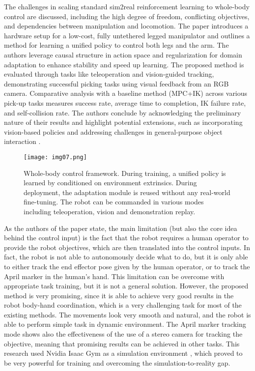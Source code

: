 The challenges in scaling standard sim2real reinforcement learning to whole-body control
are discussed, including the high degree of freedom, conflicting objectives, and dependencies
between manipulation and locomotion. The paper introduces a hardware setup for a low-cost, fully
untethered legged manipulator and outlines a method for learning a unified policy to control
both legs and the arm. The authors leverage causal structure in action space and regularization
for domain adaptation to enhance stability and speed up learning.
The proposed method is evaluated through tasks like teleoperation and vision-guided tracking,
demonstrating successful picking tasks using visual feedback from an RGB camera.
Comparative analysis with a baseline method (MPC+IK) across various pick-up tasks measures success rate,
average time to completion, IK failure rate, and self-collision rate.
The authors conclude by acknowledging the preliminary nature of their results and highlight
potential extensions, such as incorporating vision-based policies and addressing challenges
in general-purpose object interaction \cite{fu2022deeplegged}.

\begin{figure}[H]
	\centering
	\texttt{[image: img07.png]}
	\captionsetup{width=1\linewidth}
	\caption{Whole-body control framework. During training, a unified policy is learned by conditioned on
		environment extrinsics. During deployment, the adaptation module is reused without
		any real-world fine-tuning.
		The robot can be commanded in various modes including teleoperation, vision and demonstration replay.
		\cite{fu2022deeplegged}}
	\label{fig:img07}
\end{figure}

As the authors of the paper \cite{fu2022deeplegged} state, the main limitation (but also the core
idea behind the control input) is the fact that the robot requires a human operator to
provide the robot objectives, which are then translated into the control inputs. In fact,
the robot is not able to autonomously decide what to do, but it is only able to either track the
end effector pose given by the human operator, or to track the April marker in the human's hand.
This limitation can be overcome with appropriate task training, but it is not a general solution.
However, the proposed method is very promising, since it is able to achieve very good results
in the robot body-hand coordination, which is a very challenging task for most of the existing
methods. The movements look very smooth and natural, and the robot is able to perform
simple task in dynamic environment. The April marker tracking mode shows also the effectiveness of
the use of a stereo camera for tracking the objective, meaning that promising results can be
achieved in other tasks. This research used Nvidia Isaac Gym \cite{isaacgym} as a simulation environment
\cite{isaacsim}, which proved to be very powerful for training and overcoming the simulation-to-reality gap.

